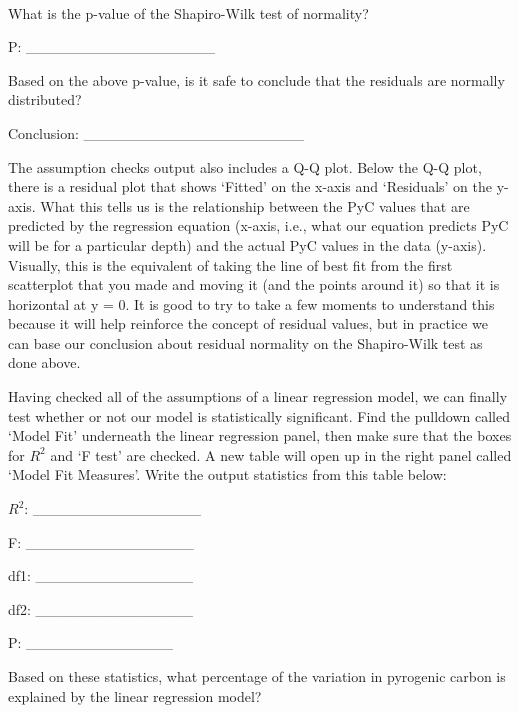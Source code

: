 \documentclass[
  openany]{krantz}
\begin{document}
\begin{verbatim}







\end{verbatim}

What is the p-value of the Shapiro-Wilk test of normality?

P: \_\_\_\_\_\_\_\_\_\_\_\_\_\_\_\_\_\_

Based on the above p-value, is it safe to conclude that the residuals are normally distributed?

Conclusion: \_\_\_\_\_\_\_\_\_\_\_\_\_\_\_\_\_\_\_\_\_

The assumption checks output also includes a Q-Q plot.
Below the Q-Q plot, there is a residual plot that shows `Fitted' on the x-axis and `Residuals' on the y-axis.
What this tells us is the relationship between the PyC values that are predicted by the regression equation (x-axis, i.e., what our equation predicts PyC will be for a particular depth) and the actual PyC values in the data (y-axis).
Visually, this is the equivalent of taking the line of best fit from the first scatterplot that you made and moving it (and the points around it) so that it is horizontal at y = 0.
It is good to try to take a few moments to understand this because it will help reinforce the concept of residual values, but in practice we can base our conclusion about residual normality on the Shapiro-Wilk test as done above.

Having checked all of the assumptions of a linear regression model, we can finally test whether or not our model is statistically significant.
Find the pulldown called `Model Fit' underneath the linear regression panel, then make sure that the boxes for \(R^{2}\) and `F test' are checked.
A new table will open up in the right panel called `Model Fit Measures'.
Write the output statistics from this table below:

\(R^{2}\): \_\_\_\_\_\_\_\_\_\_\_\_\_\_\_\_

F: \_\_\_\_\_\_\_\_\_\_\_\_\_\_\_\_

df1: \_\_\_\_\_\_\_\_\_\_\_\_\_\_\_

df2: \_\_\_\_\_\_\_\_\_\_\_\_\_\_\_

P: \_\_\_\_\_\_\_\_\_\_\_\_\_\_

Based on these statistics, what percentage of the variation in pyrogenic carbon is explained by the linear regression model?

\begin{verbatim}
\end{verbatim}
\end{document}
